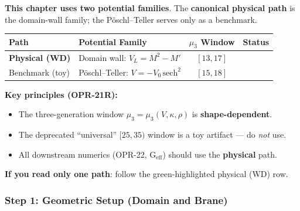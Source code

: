 \begin{tcolorbox}[breakable, enhanced, colback=green!5!white, colframe=green!50!black,
    title=\textbf{Canonical Physical Path (WD) --- Reader Route Map}, width=\linewidth]
\label{box:ch14_canonical_physical_path}

\textbf{This chapter uses two potential families}. The \textbf{canonical physical path}
is the domain-wall family; the Pöschl--Teller serves only as a benchmark.

\medskip
\begin{center}
\renewcommand{\arraystretch}{1.3}
\begin{tabular}{llcc}
\toprule
\textbf{Path} & \textbf{Potential Family} & \textbf{$\mu_3$ Window} & \textbf{Status} \\
\midrule
\rowcolor{green!10}
\textbf{Physical (WD)} & Domain wall: $V_L = M^2 - M'$ & $[13, 17]$ & \tagDc{} \\
Benchmark (toy) & Pöschl--Teller: $V = -V_0\,\text{sech}^2$ & $[15, 18]$ & \tagM{} \\
\bottomrule
\end{tabular}
\end{center}

\medskip
\textbf{Key principles (OPR-21R):}
\begin{itemize}[nosep]
    \item The three-generation window $\mu_3 = \mu_3(V, \kappa, \rho)$ is \textbf{shape-dependent}.
    \item The deprecated ``universal'' $[25, 35)$ window is a toy artifact --- do \emph{not} use.
    \item All downstream numerics (OPR-22, G$_{\text{eff}}$) should use the \textbf{physical} path.
\end{itemize}

\textbf{If you read only one path}: follow the \colorbox{green!10}{green-highlighted} physical (WD) row.
\end{tcolorbox}

\subsubsection{Step 1: Geometric Setup (Domain and Brane)}
\label{subsubsec:opr21_step1}

